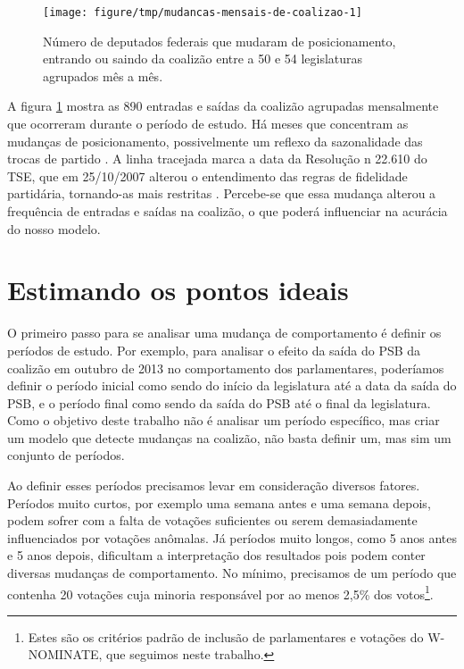 \documentclass[a4paper,titlepage]{ppgi}\usepackage[]{graphicx}\usepackage[]{color}
\newenvironment{knitrout}{}{} %
\begin{document}
\begin{knitrout}
\color{fgcolor}\begin{figure}
\texttt{[image: figure/tmp/mudancas-mensais-de-coalizao-1]} \caption[Número de deputados federais que mudaram de posicionamento, entrando ou saindo da coalizão entre a 50\textordfeminine{} e 54\textordfeminine{} legislaturas agrupados mês a mês]{Número de deputados federais que mudaram de posicionamento, entrando ou saindo da coalizão entre a 50\textordfeminine{} e 54\textordfeminine{} legislaturas agrupados mês a mês.}\label{fig:mudancas-mensais-de-coalizao}
\end{figure}


\end{knitrout}

A figura \ref{fig:mudancas-mensais-de-coalizao} mostra as
890 entradas e saídas da coalizão agrupadas
mensalmente que ocorreram durante o período de estudo. Há meses que concentram
as mudanças de posicionamento, possivelmente um reflexo da sazonalidade das
trocas de partido \cite{Araujo2000,Melo2004,Freitas2008}. A linha tracejada
marca a data da Resolução n\textordmasculine{} 22.610 do TSE, que em
25/10/2007 alterou o entendimento das
regras de fidelidade partidária, tornando-as mais restritas \cite{TSE2007}.
Percebe-se que essa mudança alterou a frequência de entradas e saídas na
coalizão, o que poderá influenciar na acurácia do nosso modelo.

\section{Estimando os pontos ideais}

O primeiro passo para se analisar uma mudança de comportamento é definir os
períodos de estudo. Por exemplo, para analisar o efeito da saída do PSB da
coalizão em outubro de 2013 no comportamento dos parlamentares, poderíamos
definir o período inicial como sendo do início da legislatura até a data da
saída do PSB, e o período final como sendo da saída do PSB até o final da
legislatura. Como o objetivo deste trabalho não é analisar um período
específico, mas criar um modelo que detecte mudanças na coalizão, não basta
definir um, mas sim um conjunto de períodos.

Ao definir esses períodos precisamos levar em consideração diversos fatores.
Períodos muito curtos, por exemplo uma semana antes e uma semana depois, podem
sofrer com a falta de votações suficientes ou serem demasiadamente
influenciados por votações anômalas. Já períodos muito longos, como 5 anos
antes e 5 anos depois, dificultam a interpretação dos resultados pois podem
conter diversas mudanças de comportamento. No mínimo, precisamos de um período
que contenha 20 votações cuja minoria responsável por ao menos 2,5\% dos
votos\footnote{Estes são os critérios padrão de inclusão de parlamentares e
votações do W-NOMINATE, que seguimos neste trabalho.}.
\end{document}
